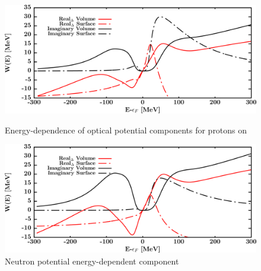 \begin{figure}[H]
    \centering
    \begin{minipage}{0.45\textwidth}
        \centering
        \includegraphics[width=1.0\textwidth]{figures/sn124_protonPotentials.png}
        \caption{Energy-dependence of optical potential components for protons
        on \snFour}
        \label{DOMFitData_sn124_proton_potentialComponent_energy}
    \end{minipage}\hfill
    \begin{minipage}{0.45\textwidth}
        \centering
        \includegraphics[width=1.0\textwidth]{figures/sn124_neutronPotentials.png}
        \caption{Neutron potential energy-dependent component}
        \label{DOMFitData_sn124_neutron_potentialComponent_energy}
    \end{minipage}
\end{figure}

